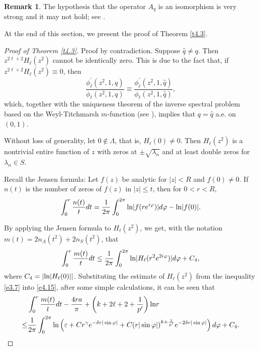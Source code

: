\documentclass[reqno,12pt,centertags]{amsart}
\renewcommand{\ln}{\text{\rm ln}}
\numberwithin{equation}{section}
\theoremstyle{definition}
\newtheorem{remark}{Remark}[section]
\begin{document}
\begin{remark}\label{r4.6}
The hypothesis that the operator $A_q$ is an isomorphism is very strong and it may not hold; see \cite[Remark 5.1]{XYB2023}.
\end{remark}


At the end of this section, we present the proof of Theorem \ref{t4.3}.


\begin{proof}[Proof of Theorem \ref{t4.3}]
Proof by contradiction. Suppose $\hat{q}\neq q$. Then 
$z^{2\ell+2}H_{\ell}(z^2)$ cannot be identically zero.
This is due to the fact that, if $z^{2\ell+2}H_{\ell}(z^2)\equiv0$, then
\begin{equation*}
\frac{\phi_{\ell}^{\prime}(z^2,1,q)}
{\phi_{\ell}(z^2,1,q)}
\equiv\frac{\phi_{\ell}^{\prime}(z^2,1,\hat{q})}
{\phi_{\ell}(z^2,1,\hat{q})},
\end{equation*}
which, together with the uniqueness theorem of the inverse spectral problem based on the Weyl-Titchmarsh $m$-function (see \cite{KST2010}), implies that $q=\hat{q}$ a.e. on $(0,1)$.

Without loss of generality, let $0\notin\Lambda$, that is, $H_{\ell}(0)\neq 0$. Then $H_{\ell}(z^2)$ is a nontrivial entire function of $z$ with zeros at $\pm \sqrt{\lambda_n}$ and at least double zeros for $\lambda_n \in S$.

Recall the Jensen formula: Let $f(z)$ be analytic for $|z|<R$ and $f(0) \neq 0$. If $n(t)$ is the number of zeros of $f(z)$ in $|z| \leq t$, then for $0<r<R$, 
\begin{align*}
\int_{0}^{r} \frac{n(t)}{t} d t
=\frac{1}{2\pi}\int_{0}^{2\pi}\ln|f(re^{i\varphi})|d\varphi-\ln|f(0)|.
\end{align*}

By applying the Jensen formula to $H_{\ell}(z^2)$, we get, with the notation $m(t)=2n_{\Lambda}(t^2)+2n_S(t^2)$, that
\begin{equation}\label{e4.15}
\int_{0}^{r}\frac{m(t)}{t}dt 
\leq \frac{1}{2\pi} \int_{0}^{2\pi} 
\ln|H_{\ell}(r^2 e^{2i\varphi})|d\varphi+C_4, 
\end{equation}
where $C_4=| \ln | H_{\ell}(0)| |$. Substituting the estimate of $H_{\ell}(z^2)$ from the inequality \eqref{e3.7} into \eqref{e4.15}, after some simple calculations, it can be seen that 
\begin{equation}\label{e4.16}
\begin{split}
& \int_{0}^{r}\frac{m(t)}{t}dt-\frac{4ra}{\pi}+\left(k+2\ell+2+\frac{1}{p^{\prime}}\right)\ln r  \\
\leq & \frac{1}{2\pi}\int_{0}^{2\pi}
\ln \left(\varepsilon+Cr^{\gamma}e^{-\delta r|\sin \varphi|}
+C(r|\sin \varphi|)^{k+\frac{1}{p^{\prime}}}
e^{-2\delta r|\sin \varphi|}\right)d\varphi
+C_4.
\end{split}
\end{equation}


\end{proof}
\end{document}
